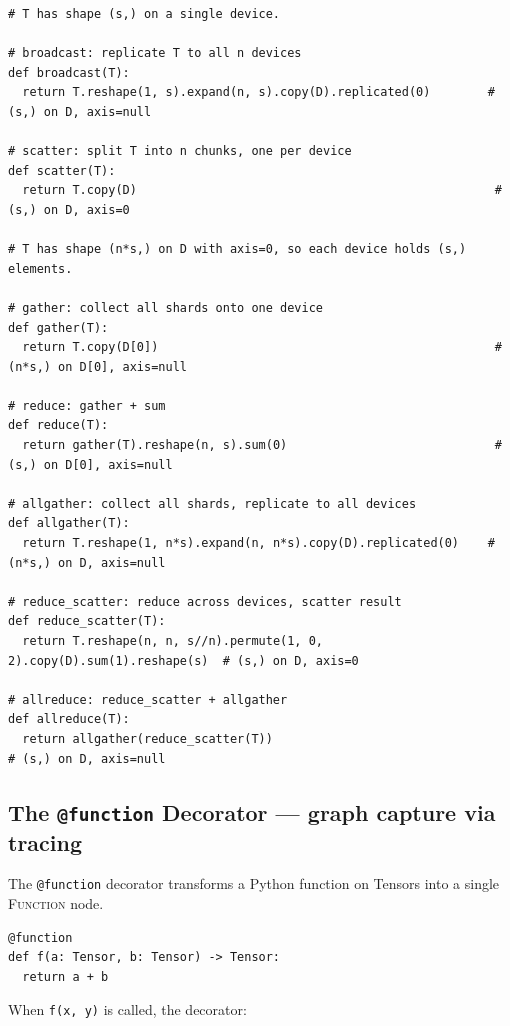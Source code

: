 \documentclass[10pt,letterpaper]{article}
\newcommand{\op}[1]{\textsc{#1}}
\begin{document}
\begin{lstlisting}
# T has shape (s,) on a single device.

# broadcast: replicate T to all n devices
def broadcast(T):
  return T.reshape(1, s).expand(n, s).copy(D).replicated(0)        # (s,) on D, axis=null

# scatter: split T into n chunks, one per device
def scatter(T):
  return T.copy(D)                                                  # (s,) on D, axis=0

# T has shape (n*s,) on D with axis=0, so each device holds (s,) elements.

# gather: collect all shards onto one device
def gather(T):
  return T.copy(D[0])                                               # (n*s,) on D[0], axis=null

# reduce: gather + sum
def reduce(T):
  return gather(T).reshape(n, s).sum(0)                             # (s,) on D[0], axis=null

# allgather: collect all shards, replicate to all devices
def allgather(T):
  return T.reshape(1, n*s).expand(n, n*s).copy(D).replicated(0)    # (n*s,) on D, axis=null

# reduce_scatter: reduce across devices, scatter result
def reduce_scatter(T):
  return T.reshape(n, n, s//n).permute(1, 0, 2).copy(D).sum(1).reshape(s)  # (s,) on D, axis=0

# allreduce: reduce_scatter + allgather
def allreduce(T):
  return allgather(reduce_scatter(T))                                       # (s,) on D, axis=null
\end{lstlisting}

\subsection*{{\color{callblue}The \texttt{@function} Decorator} \normalfont\small--- graph capture via tracing}

The \texttt{@function} decorator transforms a Python function on Tensors into a single \op{Function} node.

\begin{lstlisting}
@function
def f(a: Tensor, b: Tensor) -> Tensor:
  return a + b
\end{lstlisting}

When \texttt{f(x, y)} is called, the decorator:
\end{document}
